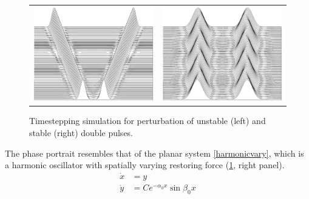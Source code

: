 \documentclass[12pt,reqno,oneside]{article}
\theoremstyle{definition}
\theoremstyle{remark}
\begin{document}
\begin{figure}[H]
\begin{tabular}{cc}
\includegraphics[width=7cm]{images/waterfallunstable.eps}  &
\includegraphics[width=7cm]{images/waterfallstable.eps}
\end{tabular}
\caption{Timestepping simulation for perturbation of unstable (left) and stable (right) double pulses.}
\label{fig:KdV5timestep}
\end{figure}
The phase portrait resembles that of the planar system \eqref{harmonicvary}, which is a harmonic oscillator with spatially varying restoring force (\cref{fig:KdV5timestep}, right panel).
\begin{equation}\label{harmonicvary}
\begin{aligned}
\dot{x} &= y \\
\dot{y} &= C e^{-\alpha_0 x} \sin \beta_0 x
\end{aligned}
\end{equation} 


\footnotesize{  }
\end{document}
